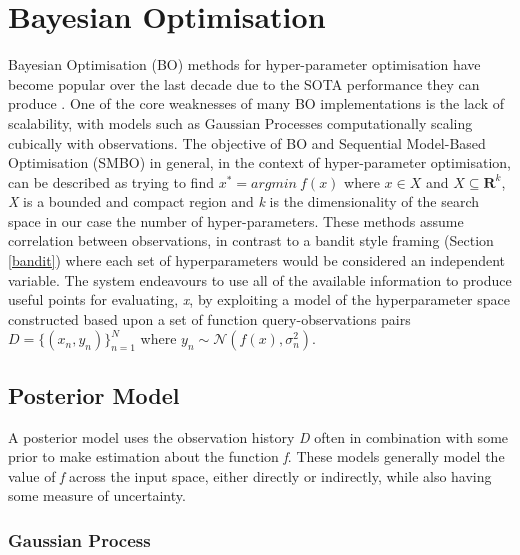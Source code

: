 \documentclass{article}
\begin{document}


\newpage

\section {Bayesian Optimisation}

	Bayesian Optimisation (BO) methods for hyper-parameter optimisation have become popular over the last decade due to the SOTA performance they can produce \cite{32} \cite{20}. One of the core weaknesses of many BO implementations is the lack of scalability, with models such as Gaussian Processes computationally scaling cubically with observations. The objective of BO and Sequential Model-Based Optimisation (SMBO) in general, in the context of hyper-parameter optimisation, can be described as trying to find \(x^* = argmin~ f(x)\) where \(x \in X\) and \(X \subseteq \mathbf{R} ^k\), \textit{X} is a bounded and compact region and \textit{k} is the dimensionality of the search space in our case the number of hyper-parameters. These methods assume correlation between observations, in contrast to a bandit style framing (Section \ref{bandit}) where each set of hyperparameters would be considered an independent variable. The system endeavours to use all of the available information to produce useful points for evaluating, \textit{x}, by exploiting a model of the hyperparameter space constructed based upon a set of function query-observations pairs \( D = \{(x_n,y_n)\}_{n=1}^N\) where \(y_n \sim \mathcal{N}(f(x), \sigma_n^2) \).




	\subsection{Posterior Model}

		A posterior model uses the observation history \textit{D} often in combination with some prior to make estimation about the function \textit{f}. These models generally model the value of \textit{f} across the input space, either directly or indirectly, while also having some measure of uncertainty.




		\subsubsection{Gaussian Process}
\end{document}
